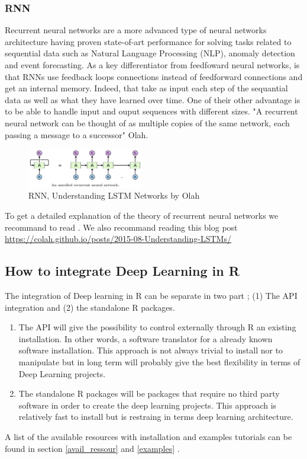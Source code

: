 \documentclass[6pt,letter]{article}\usepackage[]{graphicx}\usepackage[]{color}
\begin{document}
\subsubsection{RNN}
Recurrent neural networks are a more advanced type of neural networks architecture having proven state-of-art performance for solving tasks related to sequential data such as Natural Language Processing (NLP), anomaly detection and event forecasting. As a key differentiator from feedfoward neural networks, is that RNNs use feedback loops connections instead of feedforward connections and get an internal memory. Indeed, that take as input each step of the sequantial data as well as what they have learned over time. One of their other advantage is to be able to handle input and ouput sequences with different sizes. "A recurrent neural network can be thought of as multiple copies of the same network, each passing a message to a successor" Olah.
\begin{figure}[h]
    \centering
    \includegraphics[width=0.45\textwidth]{RNN_process.png}
     \caption{RNN, Understanding LSTM Networks by Olah}
     \label{fig:simule}
\end{figure}

To get a detailed explanation of the theory of recurrent neural networks we recommand to read \cite[Chapter 10]{Goodfellow-et-al-2016}. We also recommand reading this blog post \url{https://colah.github.io/posts/2015-08-Understanding-LSTMs/}

\subsection{How to integrate Deep Learning in R}
The integration of Deep learning in R can be separate in two part ; (1) The \ac{API} integration and (2) the standalone R packages. 
\begin{enumerate}
\item The \ac{API} will give the possibility to control externally through R an existing installation. In other words, a software translator for a already known software installation. This approach is not always trivial to install nor to manipulate but in long term will probably give the best flexibility in terms of Deep Learning projects.
\item The standalone R packages will be packages that require no third party software in order to create the deep learning projects. This approach is relatively fast to install but is restraing in terms deep learning architecture.
\end{enumerate}
A list of the available resources with installation and examples tutorials can be found in section \ref{avail_ressour} and \ref{examples} .
\end{document}
